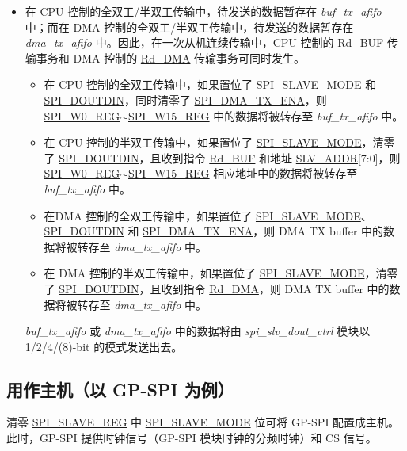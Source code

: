 \documentclass[main\_\_CN.tex]{subfiles}
\begin{document}
\begin{itemize}
    \item 在 CPU 控制的全双工/半双工传输中，待发送的数据暂存在 \textit{buf\_tx\_afifo} 中；而在 DMA 控制的全双工/半双工传输中，待发送的数据暂存在 \textit{dma\_tx\_afifo} 中。因此，在一次从机连续传输中，CPU 控制的 \hyperref[cmd:rdbuf]{Rd\_BUF} 传输事务和 DMA 控制的 \hyperref[cmd:rddma]{Rd\_DMA} 传输事务可同时发生。
    \begin{itemize}
        \item 在 CPU 控制的全双工传输中，如果置位了 \hyperref[fielddesc:SPISLAVEMODE]{SPI\_SLAVE\_MODE} 和 \hyperref[fielddesc:SPIDOUTDIN]{SPI\_DOUTDIN}，同时清零了 \hyperref[fielddesc:SPIDMATXENA]{SPI\_DMA\_TX\_ENA}，则 \hyperref[regdesc:SPIW0REG]{SPI\_W0\_REG}$\sim$\hyperref[regdesc:SPIW15REG]{SPI\_W15\_REG} 中的数据将被转存至 \textit{buf\_tx\_afifo} 中。
        \item 在 CPU 控制的半双工传输中，如果置位了 \hyperref[fielddesc:SPISLAVEMODE]{SPI\_SLAVE\_MODE}，清零了 \hyperref[fielddesc:SPIDOUTDIN]{SPI\_DOUTDIN}，且收到指令 \hyperref[cmd:rdbuf]{Rd\_BUF} 和地址 \hyperref[regdesc:SPIW0REG]{SLV\_ADDR}[7:0]，则 \hyperref[regdesc:SPIW0REG]{SPI\_W0\_REG}$\sim$\hyperref[regdesc:SPIW15REG]{SPI\_W15\_REG} 相应地址中的数据将被转存至 \textit{buf\_tx\_afifo} 中。
        \item 在DMA 控制的全双工传输中，如果置位了 \hyperref[fielddesc:SPISLAVEMODE]{SPI\_SLAVE\_MODE}、\hyperref[fielddesc:SPIDOUTDIN]{SPI\_DOUTDIN} 和 \hyperref[fielddesc:SPIDMATXENA]{SPI\_DMA\_TX\_ENA}，则 DMA TX buffer 中的数据将被转存至 \textit{dma\_tx\_afifo} 中。
        \item 在 DMA 控制的半双工传输中，如果置位了 \hyperref[fielddesc:SPISLAVEMODE]{SPI\_SLAVE\_MODE}，清零了 \hyperref[fielddesc:SPIDOUTDIN]{SPI\_DOUTDIN}，且收到指令 \hyperref[cmd:rddma]{Rd\_DMA}，则 DMA TX buffer 中的数据将被转存至 \textit{dma\_tx\_afifo} 中。
        
    \end{itemize}
    
\textit{buf\_tx\_afifo} 或 \textit{dma\_tx\_afifo} 中的数据将由 \textit{spi\_slv\_dout\_ctrl} 模块以 1/2/4/(8)-bit 的模式发送出去。
\end{itemize}

\subsection{用作主机（以 GP-SPI 为例）}\label{sec:gp-spi2-master-mode}

清零 \hyperref[fielddesc:SPISLAVEMODE]{SPI\_SLAVE\_REG} 中 \hyperref[regdesc:SPISLAVEREG]{SPI\_SLAVE\_MODE} 位可将 GP-SPI 配置成主机。此时，GP-SPI 提供时钟信号（GP-SPI 模块时钟的分频时钟）和 CS 信号。
\end{document}
